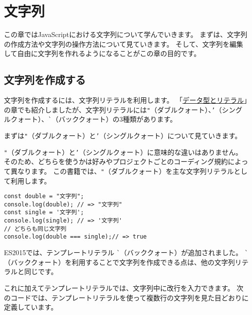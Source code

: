\hypertarget{string}{%
\chapter{文字列}\label{string}}
\thispagestyle{frontheadings}

この章ではJavaScriptにおける文字列について学んでいきます。
まずは、文字列の作成方法や文字列の操作方法について見ていきます。
そして、文字列を編集して自由に文字列を作れるようになることがこの章の目的です。

\hypertarget{create}{%
\section{文字列を作成する}\label{create}}

文字列を作成するには、文字列リテラルを利用します。
「\hyperlink{data-type-and-literal}{データ型とリテラル}」の章でも紹介しましたが、文字列リテラルには\texttt{"}（ダブルクォート）、\texttt{'}（シングルクォート）、\lstinline{`}（バッククォート）の3種類があります。

まずは\texttt{"}（ダブルクォート）と\texttt{'}（シングルクォート）について見ていきます。

\texttt{"}（ダブルクォート）と\texttt{'}（シングルクォート）に意味的な違いはありません。
そのため、どちらを使うかは好みやプロジェクトごとのコーディング規約によって異なります。
この書籍では、\texttt{"}（ダブルクォート）を主な文字列リテラルとして利用します。

\begin{lstlisting}
const double = "文字列";
console.log(double); // => "文字列"
const single = '文字列';
console.log(single); // => '文字列'
// どちらも同じ文字列
console.log(double === single);// => true
\end{lstlisting}

ES2015では、テンプレートリテラル
\lstinline{`}（バッククォート）が追加されました。
\lstinline{`}（バッククォート）を利用することで文字列を作成できる点は、他の文字列リテラルと同じです。

これに加えてテンプレートリテラルでは、文字列中に改行を入力できます。
次のコードでは、テンプレートリテラルを使って複数行の文字列を見た目どおりに定義しています。

